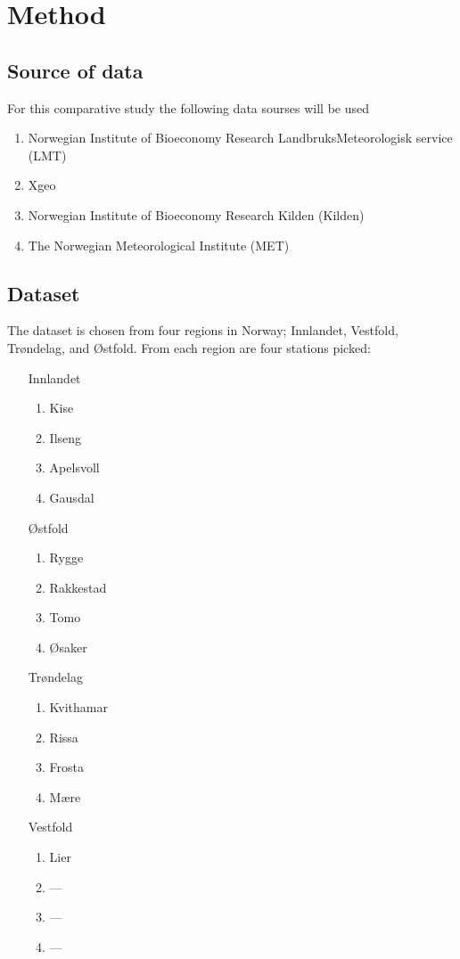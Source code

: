 \section{Method}

\subsection{Source of data}

For this comparative study the following data sourses will be used
\begin{enumerate}
	\item Norwegian Institute of Bioeconomy Research LandbruksMeteorologisk service (LMT)
	\item Xgeo
	\item Norwegian Institute of Bioeconomy Research Kilden (Kilden)
	\item The Norwegian Meteorological Institute (MET)
\end{enumerate}

\subsection{Dataset}

The dataset is chosen from four regions in Norway; Innlandet, Vestfold, Trøndelag, and Østfold. From each region are four stations picked:
\begin{itemize}
	\item[Innlandet] \begin{enumerate}
		\item Kise
		\item Ilseng
		\item Apelsvoll
		\item Gausdal
	\end{enumerate}
	\item[Østfold] \begin{enumerate}
		\item Rygge
		\item Rakkestad
		\item Tomo
		\item Øsaker
	\end{enumerate}
	\item[Trøndelag] \begin{enumerate}
		\item Kvithamar
		\item Rissa
		\item Frosta
		\item Mære
	\end{enumerate}
	\item[Vestfold] \begin{enumerate}
		\item Lier
		\item ---
		\item ---
		\item ---
	\end{enumerate}
\end{itemize}

